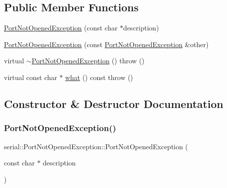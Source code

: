 \subsection*{Public Member Functions}
\begin{DoxyCompactItemize}
\item 
\mbox{\hyperlink{classserial_1_1_port_not_opened_exception_acd2213fae864534eae6a580f74c5ab1b}{Port\+Not\+Opened\+Exception}} (const char $\ast$description)
\item 
\mbox{\hyperlink{classserial_1_1_port_not_opened_exception_ae8b466d10d496a53ed8e9f949e9e628c}{Port\+Not\+Opened\+Exception}} (const \mbox{\hyperlink{classserial_1_1_port_not_opened_exception}{Port\+Not\+Opened\+Exception}} \&other)
\item 
virtual \mbox{\hyperlink{classserial_1_1_port_not_opened_exception_a1d7499214c9f43ed89676f2c90dd72a6}{$\sim$\+Port\+Not\+Opened\+Exception}} ()  throw ()
\item 
virtual const char $\ast$ \mbox{\hyperlink{classserial_1_1_port_not_opened_exception_a002185fbbe0064ebf37038696fa1664d}{what}} () const  throw ()
\end{DoxyCompactItemize}


\subsection{Constructor \& Destructor Documentation}
\mbox{\label{classserial_1_1_port_not_opened_exception_acd2213fae864534eae6a580f74c5ab1b}} 
\subsubsection{\texorpdfstring{Port\+Not\+Opened\+Exception()}{PortNotOpenedException()}\hspace{0.1cm}{\footnotesize\ttfamily [1/2]}}
{\footnotesize\ttfamily serial\+::\+Port\+Not\+Opened\+Exception\+::\+Port\+Not\+Opened\+Exception (\begin{DoxyParamCaption}\item[{const char $\ast$}]{description }\end{DoxyParamCaption})\hspace{0.3cm}{\ttfamily [inline]}}

